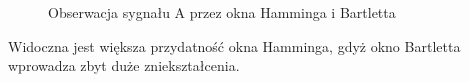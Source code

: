\documentclass[12pt,titlepage]{report}
\begin{document}
\begin{figure}[!h]
	\centering
	\caption{Obserwacja sygnału A przez okna Hamminga i Bartletta}
\end{figure}

Widoczna jest większa przydatność okna Hamminga, gdyż okno Bartletta wprowadza zbyt duże zniekształcenia.
\end{document}
